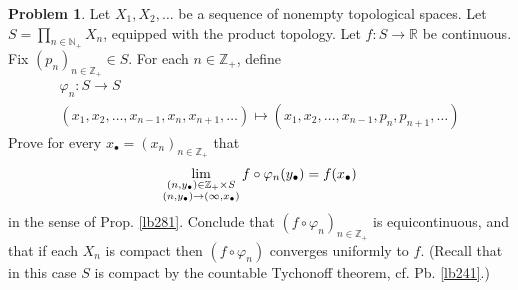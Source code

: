 \documentclass[12pt,b5paper,notitlepage]{article}
\theoremstyle{definition}
\newtheorem{prob}{\color{red}Problem}[section]
\theoremstyle{plain}
\newcommand{\blt}{\bullet}
\newcommand{\Nbb}{\mathbb N}
\newcommand{\Zbb}{\mathbb Z}
\newcommand{\Rbb}{\mathbb R}
\newcommand{\dps}{\displaystyle}
\numberwithin{equation}{section}
\begin{document}
\begin{prob}\label{lb453}
Let $X_1,X_2,\dots$ be a sequence of nonempty topological spaces. Let $S=\prod_{n\in\Nbb_+}X_n$, equipped with the product topology. Let $f: S \rightarrow \mathbb{R}$ be continuous. Fix $\left(p_n\right)_{n \in \mathbb{Z}_{+}} \in S$. For each $n \in \mathbb{Z}_{+}$, define
\begin{gather*}
\varphi_n : S \rightarrow S \\
\left(x_1, x_2, \ldots, x_{n-1}, x_n, x_{n+1}, \ldots\right)  \mapsto\left(x_1, x_2, \ldots, x_{n-1}, p_n, p_{n+1}, \ldots\right)
\end{gather*}
Prove for every $x_\blt=(x_n)_{n\in\Zbb_+}$ that
\begin{align*}
\lim_{
\begin{subarray}{c}
(n,y_\blt)\in \Zbb_+\times S\\
(n,y_\blt)\rightarrow(\infty,x_\blt)
\end{subarray}
}f\circ\varphi_n(y_\blt)=f(x_\blt)
\end{align*}
in the sense of Prop. \ref{lb281}. Conclude that $(f\circ\varphi_n)_{n\in\Zbb_+}$ is equicontinuous, and that if each $X_n$ is compact then $(f\circ\varphi_n)$ converges uniformly to $f$. (Recall that in this case $S$ is compact by the countable Tychonoff theorem, cf. Pb. \ref{lb241}.)
\end{prob}










\begin{comment}


Let $g_n:[0,1]\rightarrow\Rbb$ be $g_n(x)=n^{-1}x^n$ if $n\neq0$. Equip $\Zbb^\times=\Zbb\setminus\{0\}$ with the usual order $\leq$. Then $(g_n)_{n\in\Zbb^\times}$ is a net of continuous functions converging pointwise to $0$, and is decreasing over $n$ when  $n\in\Zbb_+$.  Thus, by Pb. \ref{lb285}, for every $x\in[0,1]$, we have $\dps\lim_{(n,p)\rightarrow(+\infty,x)
}g_n(p)=g(x)$. Clearly $(g_n)_{n\in\Zbb^\times}$ converges uniformly to $0$. However, it is not hard to check that this net of functions is not equicontinuous. (The bad thing happens when $n<0$.) 


These examples indicate why condition (1) of Thm. \ref{lb277} or (1') of Prop. \ref{lb281} is more natural than ``equicontinuity + pointwise convergence": Condition (1') of Prop. \ref{lb281} can be viewed as a continuity condition which is not ``equi" over all $\alpha$ in the index set $I$, but is ``equi" for sufficiently large $\alpha$.
\end{comment}
\end{document}
